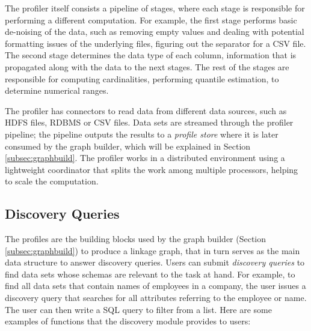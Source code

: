 The profiler itself consists a pipeline of stages, where each stage is
responsible for performing a different computation. For example, the first stage
performs basic de-noising of the data, such as removing empty values and dealing
with potential formatting issues of the underlying files, \eg figuring out the
separator for a CSV file.  The second stage determines the data type of each
column, information that is propagated along with the data to the next stages.
The rest of the stages are responsible for computing cardinalities, performing
quantile estimation, \eg to determine numerical ranges.

The profiler has connectors to read data from different data sources, such as
HDFS files, RDBMS or CSV files. Data sets are streamed through the profiler
pipeline;  the pipeline outputs the results
to a {\it profile store} where it is later consumed by the graph builder, which
will be explained in Section \ref{subsec:graphbuild}.
The profiler works in a distributed environment using a lightweight coordinator
that splits the work among multiple processors, helping to scale the
computation.


\subsection{Discovery Queries}
\label{subsec:api}

The profiles are the building blocks used by the graph builder (Section
\ref{subsec:graphbuild}) to produce a linkage graph, that in turn serves as the
main data structure to answer discovery queries. Users can submit
\emph{discovery queries} to find data sets whose schemas are relevant to the
task at hand. For example, to find all data sets that contain names of employees
in a company, the user issues a discovery query that searches for all attributes
referring to the employee or name. The user can then write a SQL query to filter
from a list. Here are some examples of functions that the discovery module
provides to users:

